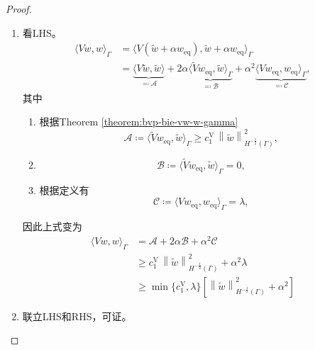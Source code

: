 \begin{proof}
\begin{enumerate}
\item 看LHS。
\begin{equation*}
  \begin{split}
    \langle V w, w \rangle_{\Gamma}
    & = \langle
    V \left(\widetilde{w} + \alpha w_{\text{eq}} \right),
    \widetilde{w} + \alpha w_{\text{eq}}
    \rangle_{\Gamma} \\
    & =
    \underbrace{
    \langle V \widetilde{w}, \widetilde{w} \rangle
    }_{\eqqcolon \mathcal{A}}
    + 2 \alpha
    \underbrace{
    \langle
    \widetilde{V} w_{\text{eq}}, \widetilde{w}
    \rangle_{\Gamma}
    }_{\eqqcolon \mathcal{B}}
    + \alpha^{2}
    \underbrace{
    \langle
    V w_{\text{eq}}, w_{\text{eq}}
    \rangle_{\Gamma}
    }_{\eqqcolon \mathcal{C}},
  \end{split}
\end{equation*}
其中
\begin{enumerate}
  \item 根据Theorem \ref{theorem:bvp-bie-vw-w-gamma}
\begin{equation*}
  \mathcal{A} \coloneqq \langle
  \widetilde{V} w_{\text{eq}}, \widetilde{w}
  \rangle_{\Gamma} \ge c_{1}^{\text{V}} \, \left\| \widetilde{w} \right\|_{H^{-\frac{1}{2}}(\Gamma)}^{2},
\end{equation*}
\item
\begin{equation*}
  \mathcal{B} \coloneqq
  \langle
  \widetilde{V} w_{\text{eq}}, \widetilde{w}
  \rangle_{\Gamma} = 0,
\end{equation*}
\item 根据定义有
\begin{equation*}
  \mathcal{C} \coloneqq
  \langle
  V w_{\text{eq}}, w_{\text{eq}}
  \rangle_{\Gamma} = \lambda,
\end{equation*}
\end{enumerate}

因此上式变为
\begin{equation*}
  \begin{split}
    \langle V w, w \rangle_{\Gamma}
    &= \mathcal{A} + 2 \alpha \mathcal{B} + \alpha^{2} \mathcal{C} \\
    & \ge c_{1}^{\text{V}} \, \left\| \widetilde{w} \right\|_{H^{-\frac{1}{2}}(\Gamma)}^{2} + \alpha^{2} \lambda \\
    & \ge \min \{ c_{1}^{\text{V}}, \lambda \}
    \left[
    \left\|
    \widetilde{w} \right\|_{H^{-\frac{1}{2}}(\Gamma)}^{2} + \alpha^{2}
    \right]
  \end{split}
\end{equation*}

\item 联立LHS和RHS，可证。
\end{enumerate}
\end{proof}

